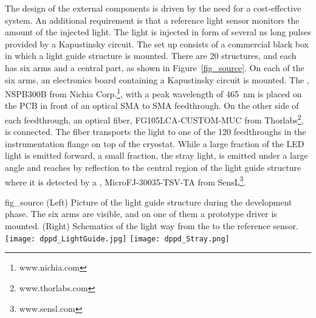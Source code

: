 The design of the external components is driven by the need for a cost-effective system. An additional requirement is that a reference light sensor monitors the amount of the injected light. The light is injected in form of several \si{\ns} long pulses provided by a Kapustinsky circuit. The set up consists of a commercial black box in which a light guide structure is mounted. There are \num{20} structures, and each has six arms and a central part, as shown in Figure~\ref{fig_source}. On each of the six arms, an electronics board containing a Kapustinsky circuit is mounted. The , NSPB300B from Nichia Corp.\footnote{www.nichia.com}, with a peak wavelength of \SI{465}{nm} is placed  on the PCB in front of an optical SMA to SMA feedthrough. On the other side of each feedthrough, an optical fiber, FG105LCA-CUSTOM-MUC from Thorlabs\footnote{www.thorlabs.com}, is connected. The fiber transports the light to one of the \num{120} feedthroughs in the instrumentation flange on top of the cryostat. While a large fraction of the LED light is emitted forward, a small fraction, the stray light, is emitted under a large angle and reaches by reflection to the central region of the light guide structure where it is detected by a , MicroFJ-30035-TSV-TA from SensL\footnote{www.sensl.com}.



\begin{dunefigure}{fig_source}
{(Left) Picture of the light guide structure during the development phase. The six arms are visible, and on one of them a prototype  driver is mounted. (Right) Schematics of the light way from the  to the reference sensor.}
\texttt{[image: dppd\_LightGuide.jpg]}
\texttt{[image: dppd\_Stray.png]}
\end{dunefigure}





